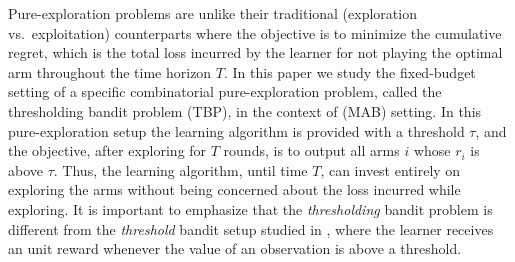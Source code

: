 Pure-exploration problems are unlike their traditional (exploration vs.\ exploitation) counterparts where the  objective is to minimize the cumulative regret, which is the total loss incurred by the learner for not playing the optimal arm throughout the time horizon $T$. In this paper we study the fixed-budget setting of a specific combinatorial pure-exploration problem, called the thresholding bandit problem (TBP), in the context of (MAB) setting. In this pure-exploration setup the learning algorithm is provided with a threshold $\tau$, and the objective, after exploring for $T$ rounds, is to  output all arms $i$ whose $r_{i}$ is above $\tau$. Thus, the learning algorithm, until time $T$, can invest entirely on exploring the arms  without being concerned about the loss incurred while exploring. It is important to emphasize that the \emph{thresholding} bandit problem is different from the \emph{threshold} bandit setup studied in \cite{abernethy2016threshold}, where the learner receives an unit reward whenever the value of an observation is above a threshold. 





